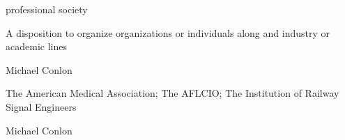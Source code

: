 \documentclass[letterpaper,10pt,english]{sphinxmanual}
\begin{document}
\begin{sphinxShadowBox}

\sphinxAtStartPar
professional society
\end{sphinxShadowBox}

\begin{sphinxShadowBox}

\sphinxAtStartPar
{\hyperref[\detokenize{doc-BFO_0000016::doc}]{}}
\end{sphinxShadowBox}

\begin{sphinxShadowBox}

\sphinxAtStartPar
A disposition to organize organizations or individuals along and industry or academic lines
\end{sphinxShadowBox}

\begin{sphinxShadowBox}

\sphinxAtStartPar
Michael Conlon 
\end{sphinxShadowBox}

\begin{sphinxShadowBox}

\sphinxAtStartPar
The American Medical Association; The AFL\sphinxhyphen{}CIO; The Institution of Railway Signal Engineers
\end{sphinxShadowBox}

\begin{sphinxShadowBox}

\sphinxAtStartPar
{}
\end{sphinxShadowBox}

\begin{sphinxShadowBox}

\sphinxAtStartPar
Michael Conlon 
\end{sphinxShadowBox}
\begin{quote}

\ignorespaces \end{quote}
\end{document}
